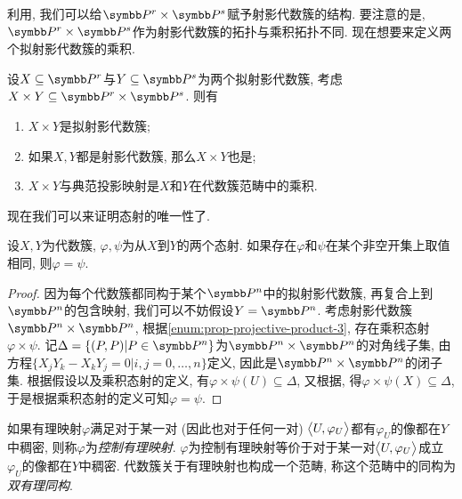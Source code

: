 利用, 我们可以给$\PP^r\times\PP^s$赋予射影代数簇的结构. 要注意的是, $\PP^r\times\PP^s$作为射影代数簇的拓扑与乘积拓扑不同. 现在想要来定义两个拟射影代数簇的乘积.

\begin{proposition}\label{prop:projectiveproduct}
  设$X\subseteq\PP^r$与$Y\subseteq\PP^s$为两个拟射影代数簇, 考虑$X\times Y\subseteq \PP^r\times\PP^s$. 则有
  \begin{enumerate}
    \item $X\times Y$是拟射影代数簇;
    \item 如果$X, Y$都是射影代数簇, 那么$X\times Y$也是;
    \item\label{enum:prop-projective-product-3} $X\times Y$与典范投影映射是$X$和$Y$在代数簇范畴中的乘积.
  \end{enumerate}
\end{proposition}

现在我们可以来证明态射的唯一性了.

\begin{proposition}
  设$X, Y$为代数簇, $\varphi, \psi$为从$X$到$Y$的两个态射. 如果存在$\varphi$和$\psi$在某个非空开集上取值相同, 则$\varphi=\psi$.
\end{proposition}

\begin{proof}
  因为每个代数簇都同构于某个$\PP^n$中的拟射影代数簇, 再复合上到$\PP^n$的包含映射, 我们可以不妨假设$Y=\PP^n$. 考虑射影代数簇$\PP^n\times \PP^n$, 根据\ref{enum:prop-projective-product-3}, 存在乘积态射$\varphi\times \psi$. 记$\Delta=\{(P, P)\vert P\in \PP^n\}$为$\PP^n\times \PP^n$的对角线子集, 由方程$\{X_jY_k-X_kY_j=0\vert i, j=0, \dotsc, n\}$定义, 因此是$\PP^n\times \PP^n$的闭子集. 根据假设以及乘积态射的定义, 有$\varphi\times \psi(U)\subseteq \Delta$, 又根据, 得$\varphi\times \psi(X)\subseteq\Delta$, 于是根据乘积态射的定义可知$\varphi=\psi$.
\end{proof}

如果有理映射$\varphi$满足对于某一对 (因此也对于任何一对) $\lrbig<>{U, \varphi_U}$都有$\varphi_U$的像都在$Y$中稠密, 则称$\varphi$为\emph{控制有理映射}. $\varphi$为控制有理映射等价于对于某一对$\lrbig<>{U, \varphi_U}$成立$\varphi_U$的像都在$Y$中稠密. 代数簇关于有理映射也构成一个范畴, 称这个范畴中的同构为\emph{双有理同构}.

